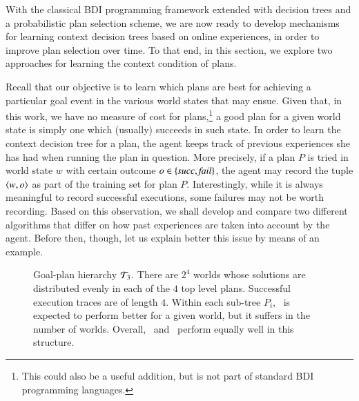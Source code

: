 With the classical BDI programming framework extended with decision trees and a
probabilistic plan selection scheme, we are now ready to develop mechanisms for
learning context decision trees
based on online experiences, in order to improve plan selection over time.
To that end, in this section, we explore two approaches for learning the context
condition of plans.



Recall that our objective is to learn which plans are best for achieving
a particular goal event in the various world states that may ensue. Given that,
in this work, we have no measure of cost for plans,\footnote{This could also be a
useful addition, but is not part of standard BDI programming languages.} a good
plan for a given world state is simply one which (usually) succeeds in such
state. In order to learn the context decision tree for a plan, the agent keeps
track of previous experiences she has had when running the plan in question. More
precisely, if a plan $P$ is tried in world state $w$ with certain outcome $o \in
\{\mbox{\emph{succ}},\mbox{\emph{fail}}\}$, the agent may record the tuple $\langle w,o \rangle$ as part of
the training set for plan $P$.
Interestingly, while it is always meaningful to record successful executions,
some failures may not be worth recording. Based on this observation, we shall
develop and compare two different algorithms that differ on how past experiences
are taken into account by the agent. Before then, though, let us explain better
this issue by means of an example.
 

\begin{figure}[t]
\begin{center}

\end{center}
\caption{Goal-plan hierarchy ${\mathcal{T}}_3$. There are $2^4$ worlds whose solutions are
distributed evenly in each of the $4$ top level plans. Successful execution
traces are of length $4$. Within each sub-tree $P_i$, \BUL\ is expected to
perform better for a given world, but it suffers in the number of worlds. Overall, \CL\ and \BUL\
perform equally well in this structure.}
\label{fig:T3}
\end{figure}



